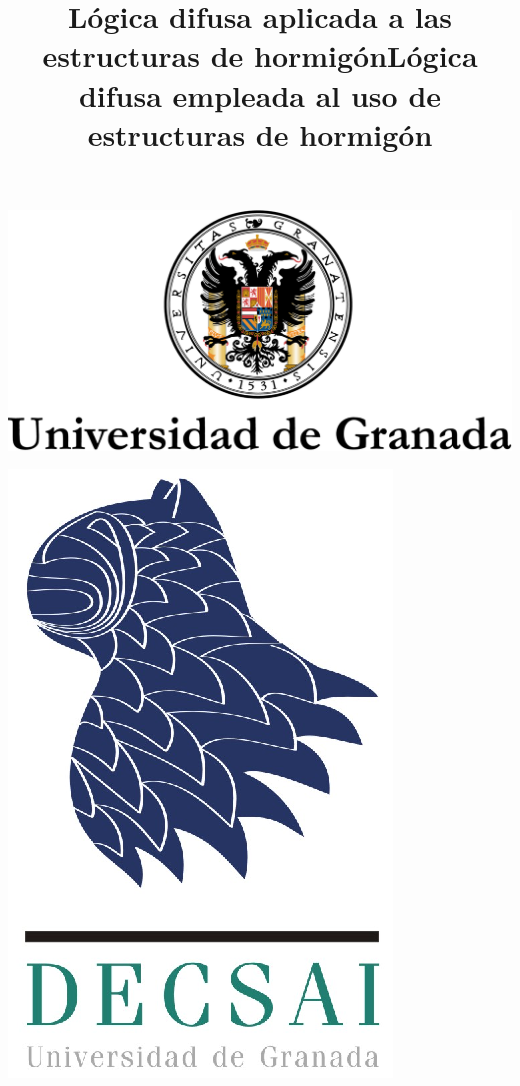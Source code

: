 \documentclass[10pt]{article}
\title{Lógica difusa aplicada a las estructuras de hormigón}
\title{Lógica difusa empleada al uso de estructuras de hormigón}
\begin{document}
\begin{center}																		%
\newcommand{\HRule}{\rule{\linewidth}{0.5mm}}									%
\begin{minipage}{0.48\textwidth} \begin{flushleft}
\includegraphics[scale = 0.35]{Imagenes/logougr.eps}
\end{flushleft}\end{minipage}
\begin{minipage}{0.48\textwidth} \begin{flushright}
\includegraphics[scale = 0.63]{Imagenes/decsailogo.eps}
\end{flushright}\end{minipage}


\end{center}
\end{document}
